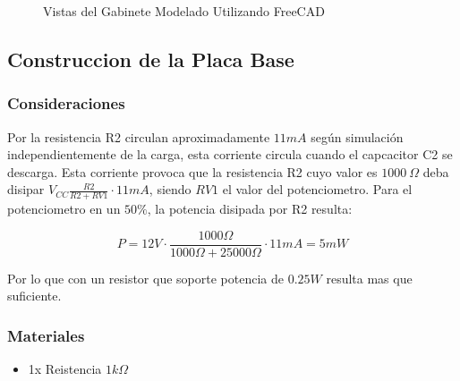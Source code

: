 \documentclass[
]{article}
\providecommand{\tightlist}{%
  \setlength{\itemsep}{0pt}\setlength{\parskip}{0pt}}
\begin{document}
\begin{figure}[!htb]
    \caption{Vistas del Gabinete Modelado Utilizando FreeCAD}
\end{figure}

\hypertarget{construccion-de-la-placa-base}{%
\subsection{Construccion de la Placa
Base}\label{construccion-de-la-placa-base}}

\hypertarget{consideraciones}{%
\subsubsection{Consideraciones}\label{consideraciones}}

Por la resistencia R2 circulan aproximadamente \(11 mA\) según
simulación independientemente de la carga, esta corriente circula cuando
el capcacitor C2 se descarga. Esta corriente provoca que la resistencia
R2 cuyo valor es \(1000\ \Omega\) deba disipar
\(V_{CC}\frac{R2}{R2+RV1}\cdot 11mA\), siendo \(RV1\) el valor del
potenciometro. Para el potenciometro en un \(50\%\), la potencia
disipada por R2 resulta:

\[P=12V\cdot \frac{1000\Omega}{1000\Omega + 25000\Omega} \cdot 11mA = 5mW\]

Por lo que con un resistor que soporte potencia de \(0.25W\) resulta mas
que suficiente.

\hypertarget{materiales}{%
\subsubsection{Materiales}\label{materiales}}

\begin{itemize}
\tightlist
\item
  1x Reistencia \(1k\Omega\)
\end{itemize}
\end{document}
